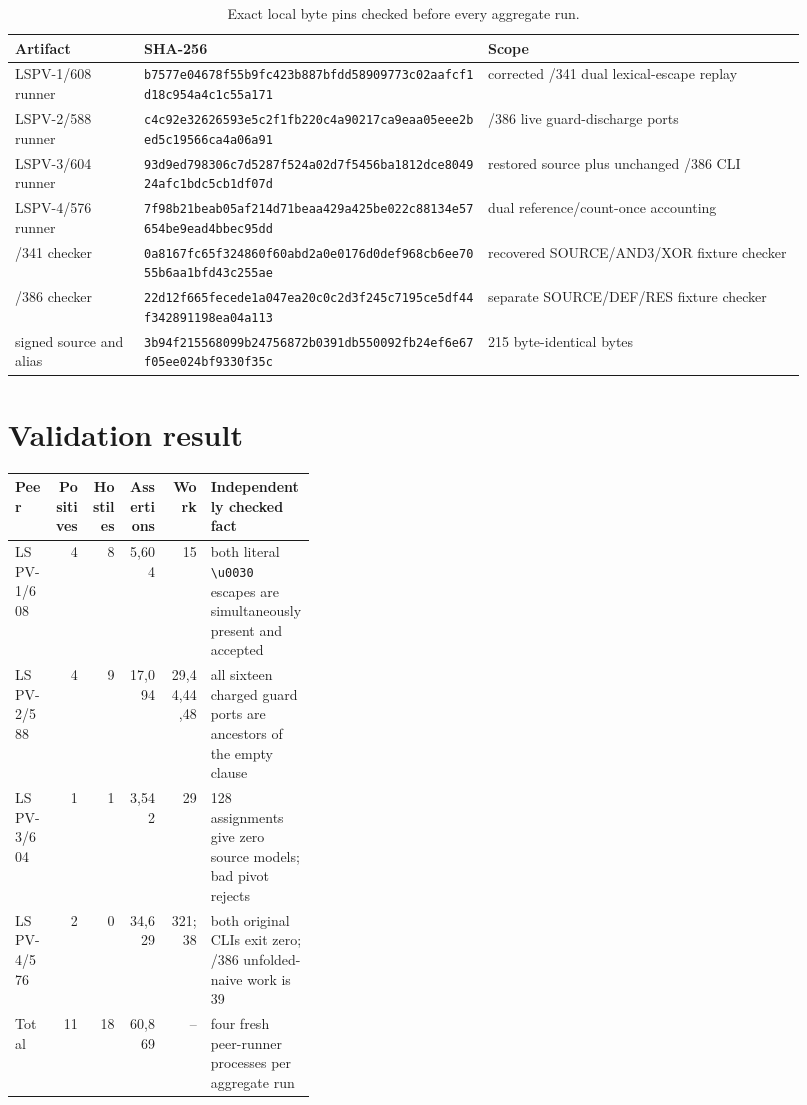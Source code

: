 \documentclass[11pt]{article}
\newcommand{\code}[1]{\texttt{#1}}
\begin{document}
\begin{table}[h]
\centering\small
\begin{tabular}{@{}p{0.15\linewidth}p{0.40\linewidth}p{0.37\linewidth}@{}}
\toprule
Artifact & SHA-256 & Scope \\
\midrule
LSPV-1/608 runner &
\code{b7577e04678f55b9fc423b887bfdd58909773c02aafcf1d18c954a4c1c55a171} &
corrected /341 dual lexical-escape replay \\
LSPV-2/588 runner &
\code{c4c92e32626593e5c2f1fb220c4a90217ca9eaa05eee2bed5c19566ca4a06a91} &
/386 live guard-discharge ports \\
LSPV-3/604 runner &
\code{93d9ed798306c7d5287f524a02d7f5456ba1812dce804924afc1bdc5cb1df07d} &
restored source plus unchanged /386 CLI \\
LSPV-4/576 runner &
\code{7f98b21beab05af214d71beaa429a425be022c88134e57654be9ead4bbec95dd} &
dual reference/count-once accounting \\
/341 checker &
\code{0a8167fc65f324860f60abd2a0e0176d0def968cb6ee7055b6aa1bfd43c255ae} &
recovered SOURCE/AND3/XOR fixture checker \\
/386 checker &
\code{22d12f665fecede1a047ea20c0c2d3f245c7195ce5df44f342891198ea04a113} &
separate SOURCE/DEF/RES fixture checker \\
signed source and alias &
\code{3b94f215568099b24756872b0391db550092fb24ef6e67f05ee024bf9330f35c} &
215 byte-identical bytes \\
\bottomrule
\end{tabular}
\caption{Exact local byte pins checked before every aggregate run.}
\end{table}

\section{Validation result}
\begin{table}[h]
\centering\small
\begin{tabular}{@{}lrrrrp{0.35\linewidth}@{}}
\toprule
Peer & Positives & Hostiles & Assertions & Work & Independently checked fact \\
\midrule
LSPV-1/608 & 4 & 8 & 5,604 & 15 & both literal \code{\textbackslash u0030}
escapes are simultaneously present and accepted \\
LSPV-2/588 & 4 & 9 & 17,094 & 29,44,44,48 & all sixteen charged guard ports are ancestors of the empty clause \\
LSPV-3/604 & 1 & 1 & 3,542 & 29 & 128 assignments give zero source models; bad pivot rejects \\
LSPV-4/576 & 2 & 0 & 34,629 & 321;38 & both original CLIs exit zero; /386 unfolded-naive work is 39 \\
\midrule
Total & 11 & 18 & 60,869 & -- & four fresh peer-runner processes per aggregate run \\
\bottomrule
\end{tabular}
\end{table}
\end{document}
